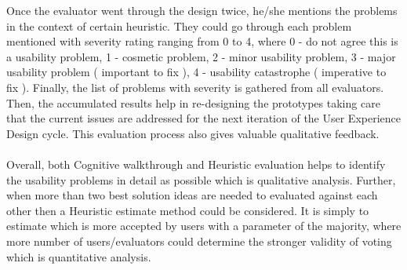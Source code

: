 Once the evaluator went through the design twice, he/she mentions the problems in the context of certain heuristic. They could go through each problem mentioned with severity rating ranging from 0 to 4, where 0 - do not agree this is a usability problem, 1 - cosmetic problem, 2 - minor usability problem, 3 - major usability problem ( important to fix ), 4 - usability catastrophe ( imperative to fix ). Finally, the list of problems with severity is gathered from all evaluators. Then, the accumulated results help in re-designing the prototypes taking care that the current issues are addressed for the next iteration of the User Experience Design cycle. This evaluation process also gives valuable qualitative feedback. \\ \\

Overall, both Cognitive walkthrough and Heuristic evaluation helps to identify the usability problems in detail as possible which is qualitative analysis. Further, when more than two best solution ideas are needed to evaluated against each other then a Heuristic estimate method could be considered. It is simply to estimate which is more accepted by users with a parameter of the majority, where more number of users/evaluators could determine the stronger validity of voting which is quantitative analysis. \\ \\

\let\cleardoublepage\clearpage
